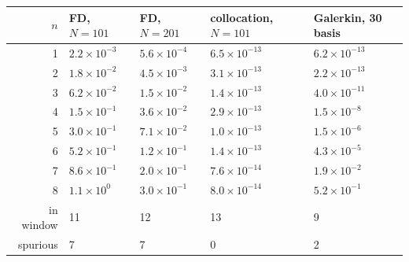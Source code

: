 \begin{tabular}{rllll}
\toprule
$n$ & FD, $N=101$ & FD, $N=201$ & collocation, $N=101$ & Galerkin, 30 basis\\
\midrule
1 & $2.2\times10^{-3}$ & $5.6\times10^{-4}$ & $6.5\times10^{-13}$ & $6.2\times10^{-13}$\\
2 & $1.8\times10^{-2}$ & $4.5\times10^{-3}$ & $3.1\times10^{-13}$ & $2.2\times10^{-13}$\\
3 & $6.2\times10^{-2}$ & $1.5\times10^{-2}$ & $1.4\times10^{-13}$ & $4.0\times10^{-11}$\\
4 & $1.5\times10^{-1}$ & $3.6\times10^{-2}$ & $2.9\times10^{-13}$ & $1.5\times10^{-8}$\\
5 & $3.0\times10^{-1}$ & $7.1\times10^{-2}$ & $1.0\times10^{-13}$ & $1.5\times10^{-6}$\\
6 & $5.2\times10^{-1}$ & $1.2\times10^{-1}$ & $1.4\times10^{-13}$ & $4.3\times10^{-5}$\\
7 & $8.6\times10^{-1}$ & $2.0\times10^{-1}$ & $7.6\times10^{-14}$ & $1.9\times10^{-2}$\\
8 & $1.1\times10^{0}$ & $3.0\times10^{-1}$ & $8.0\times10^{-14}$ & $5.2\times10^{-1}$\\
\midrule
in window & 11 & 12 & 13 & 9\\
spurious & 7 & 7 & 0 & 2\\
\bottomrule
\end{tabular}
